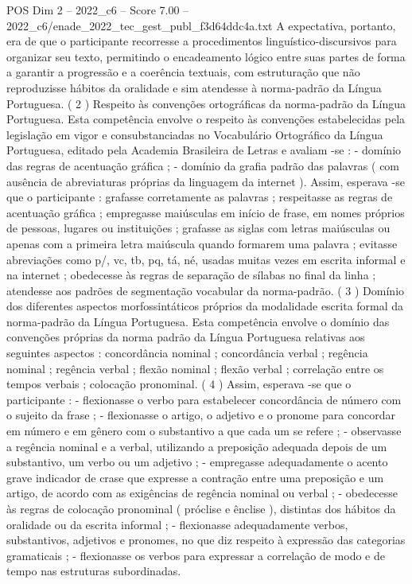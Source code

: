 \begin{textsample}{POS Dim 2 – 2022\_c6 – Score 7.00 – 2022\_c6/enade\_2022\_tec\_gest\_publ\_f3d64ddc4a.txt}
A expectativa, portanto, era de que o participante recorresse a procedimentos linguístico-discursivos para organizar seu texto, permitindo o encadeamento lógico entre suas partes de forma a garantir a progressão e a coerência textuais, com estruturação que não reproduzisse hábitos da oralidade e sim atendesse à norma-padrão da Língua Portuguesa. ( 2 ) Respeito às convenções ortográficas da norma-padrão da Língua Portuguesa.
Esta competência envolve o respeito às convenções estabelecidas pela legislação em vigor e consubstanciadas no Vocabulário Ortográfico da Língua Portuguesa, editado pela Academia Brasileira de Letras e avaliam -se : - domínio das regras de acentuação gráfica ; - domínio da grafia padrão das palavras ( com ausência de abreviaturas próprias da linguagem da internet ).
Assim, esperava -se que o participante : grafasse corretamente as palavras ; respeitasse as regras de acentuação gráfica ; empregasse maiúsculas em início de frase, em nomes próprios de pessoas, lugares ou instituições ; grafasse as siglas com letras maiúsculas ou apenas com a primeira letra maiúscula quando formarem uma palavra ; evitasse abreviações como p/, vc, tb, pq, tá, né, usadas muitas vezes em escrita informal e na internet ; obedecesse às regras de separação de sílabas no final da linha ; atendesse aos padrões de segmentação vocabular da norma-padrão. ( 3 ) Domínio dos diferentes aspectos morfossintáticos próprios da modalidade escrita formal da norma-padrão da Língua Portuguesa.
Esta competência envolve o domínio das convenções próprias da norma padrão da Língua Portuguesa relativas aos seguintes aspectos : concordância nominal ; concordância verbal ; regência nominal ; regência verbal ; flexão nominal ; flexão verbal ; correlação entre os tempos verbais ; colocação pronominal. ( 4 ) Assim, esperava -se que o participante : - flexionasse o verbo para estabelecer concordância de número com o sujeito da frase ; - flexionasse o artigo, o adjetivo e o pronome para concordar em número e em gênero com o substantivo a que cada um se refere ; - observasse a regência nominal e a verbal, utilizando a preposição adequada depois de um substantivo, um verbo ou um adjetivo ; - empregasse adequadamente o acento grave indicador de crase que expresse a contração entre uma preposição e um artigo, de acordo com as exigências de regência nominal ou verbal ; - obedecesse às regras de colocação pronominal ( próclise e ênclise ), distintas dos hábitos da oralidade ou da escrita informal ; - flexionasse adequadamente verbos, substantivos, adjetivos e pronomes, no que diz respeito à expressão das categorias gramaticais ; - flexionasse os verbos para expressar a correlação de modo e de tempo nas estruturas subordinadas.

\end{textsample}
